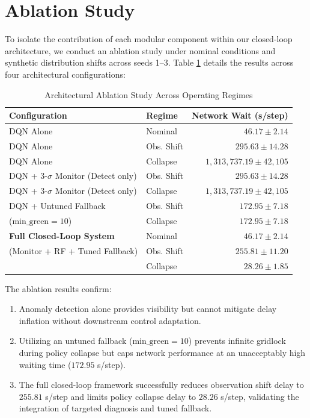 \documentclass{ieeeaccess}
\begin{document}
\section{Ablation Study}
\label{sec:ablation}
To isolate the contribution of each modular component within our closed-loop architecture, we conduct an ablation study under nominal conditions and synthetic distribution shifts across seeds 1--3. Table \ref{tab:ablation} details the results across four architectural configurations:

\begin{table}[!t]
\centering
\caption{Architectural Ablation Study Across Operating Regimes}
\label{tab:ablation}
\scriptsize
\setlength{\tabcolsep}{2.5pt}
\begin{tabular}{llr}
\toprule
\textbf{Configuration} & \textbf{Regime} & \textbf{Network Wait (s/step)} \\
\midrule
DQN Alone & Nominal & $46.17 \pm 2.14$ \\
DQN Alone & Obs. Shift & $295.63 \pm 14.28$ \\
DQN Alone & Collapse & $1,313,737.19 \pm 42,105$ \\
\midrule
DQN + 3-$\sigma$ Monitor (Detect only) & Obs. Shift & $295.63 \pm 14.28$ \\
DQN + 3-$\sigma$ Monitor (Detect only) & Collapse & $1,313,737.19 \pm 42,105$ \\
\midrule
DQN + Untuned Fallback & Obs. Shift & $172.95 \pm 7.18$ \\
($\text{min\_green}=10$) & Collapse & $172.95 \pm 7.18$ \\
\midrule
\textbf{Full Closed-Loop System} & Nominal & $\mathbf{46.17 \pm 2.14}$ \\
(Monitor + RF + Tuned Fallback) & Obs. Shift & $\mathbf{255.81 \pm 11.20}$ \\
& Collapse & $\mathbf{28.26 \pm 1.85}$ \\
\bottomrule
\end{tabular}
\end{table}

The ablation results confirm:
\begin{enumerate}
    \item Anomaly detection alone provides visibility but cannot mitigate delay inflation without downstream control adaptation.
    \item Utilizing an untuned fallback ($\text{min\_green} = 10$) prevents infinite gridlock during policy collapse but caps network performance at an unacceptably high waiting time ($172.95$ s/step).
    \item The full closed-loop framework successfully reduces observation shift delay to $255.81$ s/step and limits policy collapse delay to $28.26$ s/step, validating the integration of targeted diagnosis and tuned fallback.
\end{enumerate}
\end{document}
